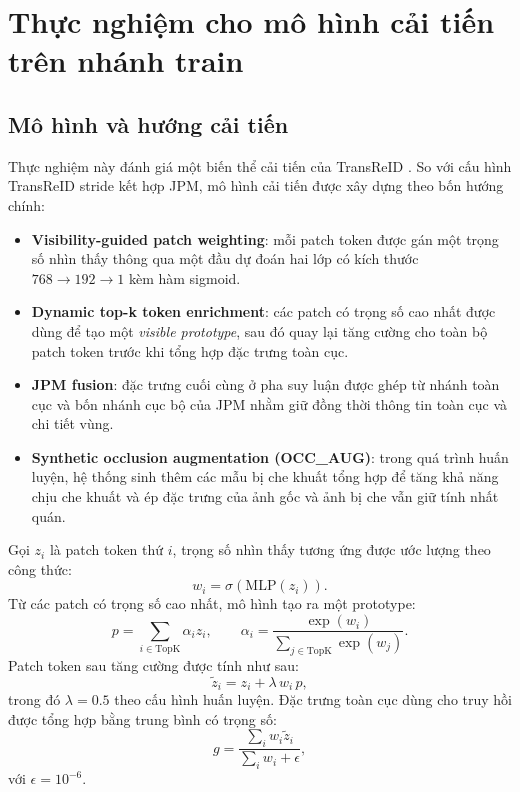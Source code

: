 
\section{Thực nghiệm cho mô hình cải tiến trên nhánh train}
\label{sec:improved-train-experiment}

\subsection{Mô hình và hướng cải tiến}
Thực nghiệm này đánh giá một biến thể cải tiến của TransReID
\cite{he2021transreidtransformerbasedobjectreidentification}. So với cấu hình TransReID stride kết hợp JPM, mô hình
cải tiến được xây dựng theo bốn hướng chính:
\begin{itemize}
    \item \textbf{Visibility-guided patch weighting}: mỗi patch token được gán
    một trọng số nhìn thấy thông qua một đầu dự đoán hai lớp có kích thước
    $768 \rightarrow 192 \rightarrow 1$ kèm hàm sigmoid.
    \item \textbf{Dynamic top-k token enrichment}: các patch có trọng số cao
    nhất được dùng để tạo một \textit{visible prototype}, sau đó quay lại tăng
    cường cho toàn bộ patch token trước khi tổng hợp đặc trưng toàn cục.
    \item \textbf{JPM fusion}: đặc trưng cuối cùng ở pha suy luận được ghép từ
    nhánh toàn cục và bốn nhánh cục bộ của JPM nhằm giữ đồng thời thông tin
    toàn cục và chi tiết vùng.
    \item \textbf{Synthetic occlusion augmentation (OCC\_AUG)}: trong quá trình
    huấn luyện, hệ thống sinh thêm các mẫu bị che khuất tổng hợp để tăng khả
    năng chịu che khuất và ép đặc trưng của ảnh gốc và ảnh bị che vẫn giữ tính
    nhất quán.
\end{itemize}

Gọi $z_i$ là patch token thứ $i$, trọng số nhìn thấy tương ứng được ước lượng
theo công thức:
\begin{equation}
w_i = \sigma(\mathrm{MLP}(z_i)).
\end{equation}
Từ các patch có trọng số cao nhất, mô hình tạo ra một prototype:
\begin{equation}
p = \sum_{i \in \mathrm{TopK}} \alpha_i z_i, \qquad
\alpha_i = \frac{\exp(w_i)}{\sum_{j \in \mathrm{TopK}} \exp(w_j)}.
\end{equation}
Patch token sau tăng cường được tính như sau:
\begin{equation}
\tilde{z}_i = z_i + \lambda \, w_i \, p,
\end{equation}
trong đó $\lambda = 0.5$ theo cấu hình huấn luyện. Đặc trưng toàn cục dùng cho
truy hồi được tổng hợp bằng trung bình có trọng số:
\begin{equation}
g = \frac{\sum_i w_i \tilde{z}_i}{\sum_i w_i + \epsilon},
\end{equation}
với $\epsilon = 10^{-6}$.

